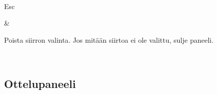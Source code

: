 \documentclass[letterpaper,10pt,finnish]{sphinxmanual}
\begin{document}
\begin{savenotes}
\begin{tabular}[t]{}
\\
\sphinxhline\begin{varwidth}[t]{}
\sphinxAtStartPar
Esc
\sphinxbeforeendvarwidth
\end{varwidth}%
&\begin{varwidth}[t]{}
\sphinxAtStartPar
Poista siirron valinta. Jos mitään siirtoa ei ole valittu, sulje paneeli.
\sphinxbeforeendvarwidth
\end{varwidth}%
\\
\sphinxbottomrule
\end{tabular}
\sphinxtableafterendhook\par
\sphinxattableend\end{savenotes}


\subsection{Ottelupaneeli}
\label{\detokenize{raccourcis:panneau-des-matchs}}\label{\detokenize{raccourcis:raccourcis-match-panel}}
\end{document}
